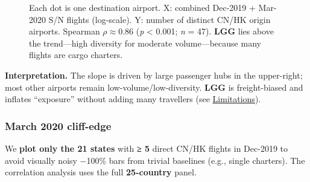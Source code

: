 \documentclass[
  authoryear,
  preprint,
  3p,
  onecolumn]{elsarticle}
\begin{document}
\label{cell-fig-scatter_volume_vs_origin}
\begin{figure}[H]


\caption{\label{fig-scatter_volume_vs_origin}Each dot is one destination
airport. X: combined Dec-2019 + Mar-2020 S/N flights (log-scale). Y:
number of distinct CN/HK origin airports. Spearman \(\rho \approx 0.86\)
(\emph{p} \textless{} 0.001; \emph{n} = 47). \textbf{LGG} lies above the
trend---high diversity for moderate volume---because many flights are
cargo charters.}

\end{figure}%

\textbf{Interpretation.} The slope is driven by large passenger hubs in
the upper-right; most other airports remain low-volume/low-diversity.
\textbf{LGG} is freight-biased and inflates ``exposure'' without adding
many travellers (see \hyperref[limitations]{Limitations}).

\subsubsection{March 2020 cliff-edge}\label{march-cliff}

We \textbf{plot only the 21 states} with \textbf{≥ 5} direct CN/HK
flights in Dec-2019 to avoid visually noisy −100\% bars from trivial
baselines (e.g., single charters). The correlation analysis uses the
full \textbf{25-country} panel.
\end{document}
